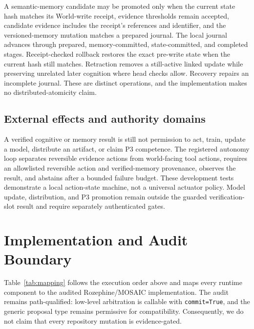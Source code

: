 \documentclass[10pt]{article}
\newcommand{\code}[1]{\texttt{#1}}
\begin{document}
A semantic-memory candidate may be promoted only when the current state hash matches its World-write receipt, evidence thresholds remain accepted, candidate evidence includes the receipt's references and identifier, and the versioned-memory mutation matches a prepared journal. The local journal advances through prepared, memory-committed, state-committed, and completed stages. Receipt-checked rollback restores the exact pre-write state when the current hash still matches. Retraction removes a still-active linked update while preserving unrelated later cognition where head checks allow. Recovery repairs an incomplete journal. These are distinct operations, and the implementation makes no distributed-atomicity claim.

\subsection{External effects and authority domains}

A verified cognitive or memory result is still not permission to act, train, update a model, distribute an artifact, or claim P3 competence. The registered autonomy loop separates reversible evidence actions from world-facing tool actions, requires an allowlisted reversible action and verified-memory provenance, observes the result, and abstains after a bounded failure budget. These development tests demonstrate a local action-state machine, not a universal actuator policy. Model update, distribution, and P3 promotion remain outside the guarded verification-slot result and require separately authenticated gates.

\section{Implementation and Audit Boundary}

Table~\ref{tab:mapping} follows the execution order above and maps every runtime component to the audited Rozephine/MOSAIC implementation. The audit remains path-qualified: low-level arbitration is callable with \code{commit=True}, and the generic proposal type remains permissive for compatibility. Consequently, we do not claim that every repository mutation is evidence-gated.
\end{document}
